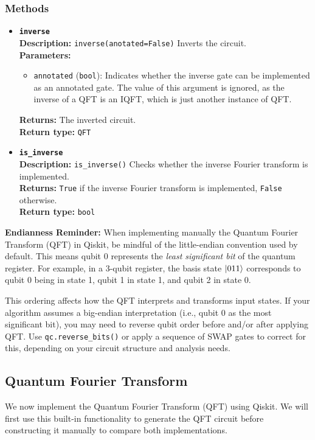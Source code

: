 \subsubsection{Methods}
\begin{itemize}
    \item \textbf{\texttt{inverse}}\\
    \textbf{Description:} \texttt{inverse(anotated=False)} Inverts the circuit.\\
    \textbf{Parameters:}
    \begin{itemize}
        \item \texttt{annotated} (\texttt{bool}): Indicates whether the inverse gate can be implemented as an annotated gate. The value of this argument is ignored, as the inverse of a QFT is an IQFT, which is just another instance of QFT.
    \end{itemize}
    \textbf{Returns:} The inverted circuit.\\
    \textbf{Return type:} \texttt{QFT}

    \item \textbf{\texttt{is\_inverse}}\\
    \textbf{Description:} \texttt{is\_inverse()} Checks whether the inverse Fourier transform is implemented.\\
    \textbf{Returns:} \texttt{True} if the inverse Fourier transform is implemented, \texttt{False} otherwise.\\
    \textbf{Return type:} \texttt{bool}
\end{itemize}
\begin{note}
\textbf{Endianness Reminder:} When implementing manually the Quantum Fourier Transform (QFT) in Qiskit, be mindful of the little-endian convention used by default. This means qubit 0 represents the \emph{least significant bit} of the quantum register. For example, in a 3-qubit register, the basis state $\ket{011}$ corresponds to qubit 0 being in state 1, qubit 1 in state 1, and qubit 2 in state 0.

This ordering affects how the QFT interprets and transforms input states. If your algorithm assumes a big-endian interpretation (i.e., qubit 0 as the most significant bit), you may need to reverse qubit order before and/or after applying QFT. Use \texttt{qc.reverse\_bits()} or apply a sequence of SWAP gates to correct for this, depending on your circuit structure and analysis needs.
\end{note}
\subsection{Quantum Fourier Transform}
We now implement the Quantum Fourier Transform (QFT) using Qiskit. We will first use this built-in functionality to generate the QFT circuit before constructing it manually to compare both implementations.


